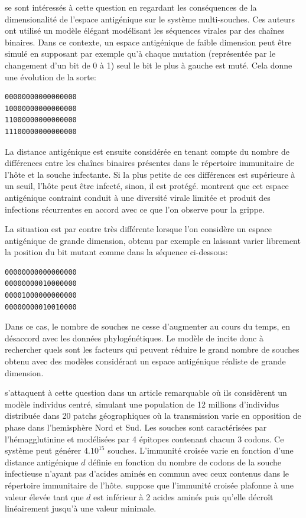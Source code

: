 \citet{Girvan2002} se sont intéressés à cette question en regardant
les conséquences de la dimensionalité de l'espace antigénique sur le
système multi-souches. Ces auteurs ont utilisé un modèle élégant
modélisant les séquences virales par des chaînes binaires. Dans ce
contexte, un espace antigénique de faible dimension peut être simulé
en supposant par exemple qu'à chaque mutation (représentée par le
changement d'un bit de 0 à 1) seul le bit le plus à gauche est muté.
Cela donne une évolution de la sorte:

\begin{verbatim}
00000000000000000
10000000000000000
11000000000000000
11100000000000000
\end{verbatim}

La distance antigénique est ensuite considérée en tenant compte du
nombre de différences entre les chaînes binaires présentes dans le
répertoire immunitaire de l'hôte et la souche infectante. Si la plus
petite de ces différences est supérieure à un seuil, l'hôte peut être
infecté, sinon, il est protégé.  \citet{Girvan2002} montrent que cet
espace antigénique contraint conduit à une diversité virale limitée et
produit des infections récurrentes en accord avec ce que l'on observe
pour la grippe.

La situation est par contre très différente lorsque l'on considère un
espace antigénique de grande dimension, obtenu par exemple en laissant
varier librement la position du bit mutant comme dans la séquence
ci-dessous:

\begin{verbatim}
00000000000000000
00000000010000000
00001000000000000
00000000010010000
\end{verbatim}

Dans ce cas, le nombre de souches ne cesse d'augmenter au cours du
temps, en désaccord avec les données phylogénétiques. Le modèle de
\citet{Girvan2002} incite donc à rechercher quels sont les facteurs
qui peuvent réduire le grand nombre de souches obtenu avec des modèles
considérant un espace antigénique réaliste de grande dimension.

\citet{Ferguson2003} s'attaquent à cette question dans un article
remarquable où ils considèrent un modèle individus centré, simulant
une population de 12 millions d'individus distribuée dans 20 patchs
géographiques où la transmission varie en opposition de phase dans
l'hemisphère Nord et Sud. Les souches sont caractérisées par
l'hémagglutinine et modélisées par 4 épitopes contenant chacun 3
codons. Ce système peut générer $4. 10^{15}$ souches. L'immunité
croisée varie en fonction d'une distance antigénique $d$ définie en
fonction du nombre de codons de la souche infectieuse n'ayant pas
d'acides aminés en commun avec ceux contenus dans le répertoire
immunitaire de l'hôte. \citet{Ferguson2003} suppose que l'immunité
croisée plafonne à une valeur élevée tant que $d$ est inférieur à 2
acides aminés puis qu'elle décroît linéairement jusqu'à une valeur
minimale.

